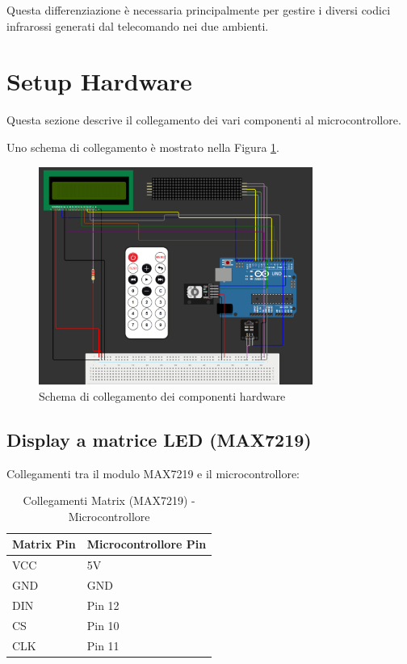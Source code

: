 \documentclass[a4paper, 12pt]{article}
\begin{document}
Questa differenziazione è necessaria principalmente per gestire i diversi codici infrarossi generati dal telecomando nei due ambienti.

\section{Setup Hardware}
\label{sec:setup}
Questa sezione descrive il collegamento dei vari componenti al microcontrollore.

Uno schema di collegamento è mostrato nella Figura \ref{fig:setup-hardware-diagram}.
\begin{figure}[H]
    \centering
    \includegraphics[width=0.8\textwidth]{media/collegamenti.png}
    \caption{Schema di collegamento dei componenti hardware}
    \label{fig:setup-hardware-diagram}
\end{figure}

\subsection{Display a matrice LED (MAX7219)}
\label{subsec:setup-max7219}
Collegamenti tra il modulo MAX7219 e il microcontrollore:

\begin{table}[H]
    \centering
    \caption{Collegamenti Matrix (MAX7219) - Microcontrollore}
    \label{tab:matrix-max7219-connections}
    \begin{tabular}{ll}
        \toprule
        \textbf{Matrix Pin} & \textbf{Microcontrollore Pin} \\
        \midrule
        VCC                 & 5V                            \\
        GND                 & GND                           \\
        DIN                 & Pin 12                        \\
        CS                  & Pin 10                        \\
        CLK                 & Pin 11                        \\
        \bottomrule
    \end{tabular}
\end{table}
\end{document}
